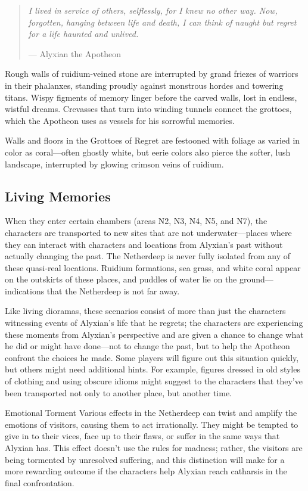 \documentclass[letterpaper, 11pt, bg=full, twocolumn]{dndbook}
\begin{document}
\begin{quotation}
\em
I lived in service of others, selflessly, for I knew no other way. Now, forgotten, hanging between life and death, I can think of naught but regret for a life haunted and unlived.

\hfill --- Alyxian the Apotheon
\end{quotation}

Rough walls of ruidium-veined stone are interrupted by grand friezes of warriors in their phalanxes, standing proudly against monstrous hordes and towering titans. Wispy figments of memory linger before the carved walls, lost in endless, wistful dreams. Crevasses that turn into winding tunnels connect the grottoes, which the Apotheon uses as vessels for his sorrowful memories.

Walls and floors in the Grottoes of Regret are festooned with foliage as varied in color as coral---often ghostly white, but eerie colors also pierce the softer, lush landscape, interrupted by glowing crimson veins of ruidium.

\subsection{Living Memories}

When they enter certain chambers (areas N2, N3, N4, N5, and N7), the characters are transported to new sites that are not underwater---places where they can interact with characters and locations from Alyxian's past without actually changing the past. The Netherdeep is never fully isolated from any of these quasi-real locations. Ruidium formations, sea grass, and white coral appear on the outskirts of these places, and puddles of water lie on the ground---indications that the Netherdeep is not far away.

Like living dioramas, these scenarios consist of more than just the characters witnessing events of Alyxian's life that he regrets; the characters are experiencing these moments from Alyxian's perspective and are given a chance to change what he did or might have done---not to change the past, but to help the Apotheon confront the choices he made. Some players will figure out this situation quickly, but others might need additional hints. For example, figures dressed in old styles of clothing and using obscure idioms might suggest to the characters that they've been transported not only to another place, but another time.

\begin{DndSidebar}{Emotional Torment}
Various effects in the Netherdeep can twist and amplify the emotions of visitors, causing them to act irrationally. They might be tempted to give in to their vices, face up to their flaws, or suffer in the same ways that Alyxian has. This effect doesn't use the rules for madness; rather, the visitors are being tormented by unresolved suffering, and this distinction will make for a more rewarding outcome if the characters help Alyxian reach catharsis in the final confrontation.
\end{DndSidebar}
\end{document}
